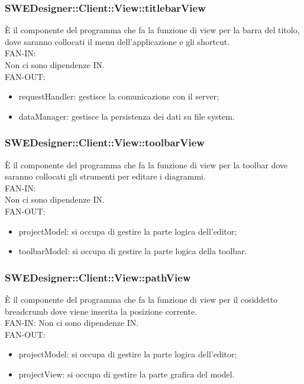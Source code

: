 \documentclass[../DefinizioneDiProdotto.tex]{subfiles}
\begin{document}
				\subsubsection{SWEDesigner::Client::View::titlebarView}
				È il componente del programma che fa la funzione di view per la barra del titolo, dove saranno collocati il menu dell’applicazione e gli shortcut.\\
					FAN-IN:\\
					Non ci sono dipendenze IN.\\
					FAN-OUT:
					\begin{itemize}
						\item requestHandler: gestisce la comunicazione con il server;
						\item dataManager: gestisce la persistenza dei dati su file system.
					\end{itemize}

				\subsubsection{SWEDesigner::Client::View::toolbarView}
				È il componente del programma che fa la funzione di view per la toolbar dove saranno collocati gli strumenti per editare i diagrammi.\\
					FAN-IN:\\
					Non ci sono dipendenze IN.\\
					FAN-OUT:
					\begin{itemize}
						\item projectModel: si occupa di gestire la parte logica dell'editor;
						\item toolbarModel: si occupa di gestire la parte logica della toolbar.
					\end{itemize}

				\subsubsection{SWEDesigner::Client::View::pathView}
				È il componente del programma che fa la funzione di view per il cosiddetto breadcrumb dove viene inserita la posizione corrente.\\
					FAN-IN:
					Non ci sono dipendenze IN. \\
					FAN-OUT:
					\begin{itemize}
						\item projectModel: si occupa di gestire la parte logica dell'editor;
						\item projectView: si occupa di gestire la parte grafica del model.
					\end{itemize}
				
\end{document}
